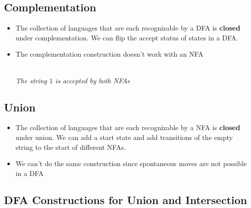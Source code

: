 \documentclass{article}
\begin{document}
\subsection{Complementation}
\begin{itemize}
    \item The collection of languages that are each recognizable by a DFA is \textbf{closed} under complementation. We can flip the accept status of states in a DFA.
    \item The complementation construction doesn't work with an NFA\\
    \hspace*{1in}
    \\
    \textit{The string $1$ is accepted by both NFAs}
\end{itemize}
\subsection{Union}
\begin{itemize}
    \item The collection of languages that are each recognizable by a NFA is \textbf{closed} under union. We can add a start state and add transitions of the empty string to the start of different NFAs.
    \item We can't do the same construction since spontaneous moves are not possible in a DFA
\end{itemize}
\newpage
\subsection{DFA Constructions for Union and Intersection}
\end{document}
